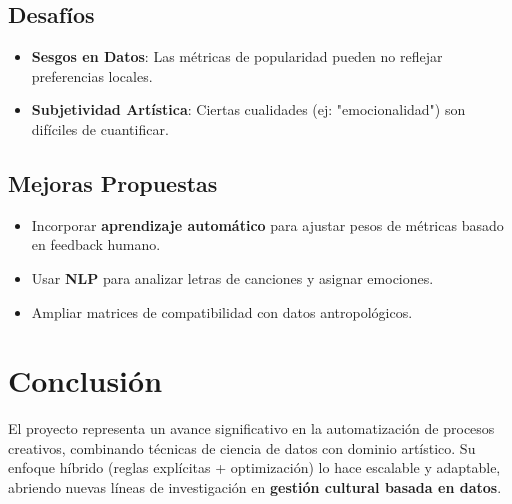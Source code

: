 \documentclass{article}
\begin{document}
\subsection{Desafíos}
\begin{itemize}
    \item \textbf{Sesgos en Datos}: Las métricas de popularidad pueden no reflejar preferencias locales.
    \item \textbf{Subjetividad Artística}: Ciertas cualidades (ej: "emocionalidad") son difíciles de cuantificar.
\end{itemize}

\subsection{Mejoras Propuestas}
\begin{itemize}
    \item Incorporar \textbf{aprendizaje automático} para ajustar pesos de métricas basado en feedback humano.
    \item Usar \textbf{NLP} para analizar letras de canciones y asignar emociones.
    \item Ampliar matrices de compatibilidad con datos antropológicos.
\end{itemize}

\section{Conclusión}
El proyecto representa un avance significativo en la automatización de procesos creativos, combinando técnicas de ciencia de datos con dominio artístico. Su enfoque híbrido (reglas explícitas + optimización) lo hace escalable y adaptable, abriendo nuevas líneas de investigación en \textbf{gestión cultural basada en datos}.
\end{document}
